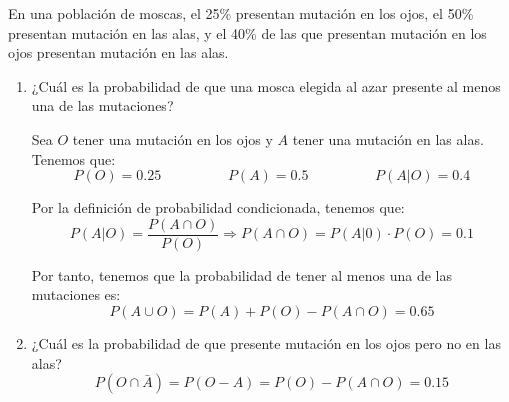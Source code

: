 \begin{ejercicio} \label{ej:4.Ejercicio4}
    En una población de moscas, el 25\% presentan mutación en los ojos, el 50\% presentan mutación en las alas, y el 40\% de las que presentan mutación en los ojos presentan mutación en las alas.
    \begin{enumerate}
        \item ¿Cuál es la probabilidad de que una mosca elegida al azar presente al menos una de las mutaciones?

        Sea $O$ tener una mutación en los ojos y $A$ tener una mutación en las alas. Tenemos que:
        \begin{equation*}
            P(O)=0.25
            \hspace{2cm}
            P(A)=0.5
            \hspace{2cm}
            P(A|O)=0.4
        \end{equation*}

        Por la definición de probabilidad condicionada, tenemos que:
        \begin{equation*}
            P(A|O) = \frac{P(A\cap O)}{P(O)} \Longrightarrow P(A\cap O) = P(A|0)\cdot P(O) = 0.1
        \end{equation*}

        Por tanto, tenemos que la probabilidad de tener al menos una de las mutaciones es:
        \begin{equation*}
            P(A\cup O) = P(A) + P(O) - P(A\cap O) = 0.65
        \end{equation*}
        

        \item ¿Cuál es la probabilidad de que presente mutación en los ojos pero no en las alas?
        \begin{equation*}
            P(O\cap \bar{A}) = P(O-A) = P(O) - P(A\cap O) = 0.15
        \end{equation*}
    \end{enumerate}
\end{ejercicio}


